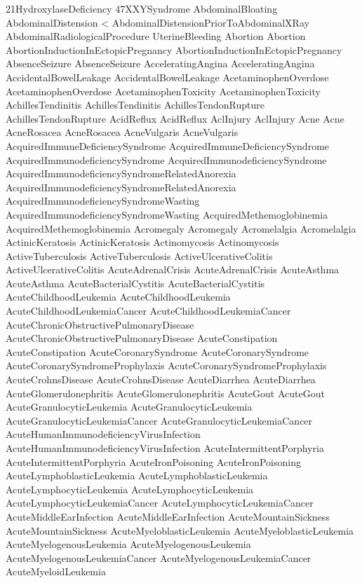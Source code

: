  21HydroxylaseDeficiency
 47XXYSyndrome
 AbdominalBloating
 AbdominalDistension < AbdominalDistensionPriorToAbdominalXRay
 AbdominalRadiologicalProcedure
 UterineBleeding
 Abortion
 Abortion
 AbortionInductionInEctopicPregnancy
 AbortionInductionInEctopicPregnancy
 AbsenceSeizure
 AbsenceSeizure
 AcceleratingAngina
 AcceleratingAngina
 AccidentalBowelLeakage
 AccidentalBowelLeakage
 AcetaminophenOverdose
 AcetaminophenOverdose
 AcetaminophenToxicity
 AcetaminophenToxicity
 AchillesTendinitis
 AchillesTendinitis
 AchillesTendonRupture
 AchillesTendonRupture
 AcidReflux
 AcidReflux
 AclInjury
 AclInjury
 Acne
 Acne
 AcneRosacea
 AcneRosacea
 AcneVulgaris
 AcneVulgaris
 AcquiredImmuneDeficiencySyndrome
 AcquiredImmuneDeficiencySyndrome
 AcquiredImmunodeficiencySyndrome
 AcquiredImmunodeficiencySyndrome
 AcquiredImmunodeficiencySyndromeRelatedAnorexia
 AcquiredImmunodeficiencySyndromeRelatedAnorexia
 AcquiredImmunodeficiencySyndromeWasting
 AcquiredImmunodeficiencySyndromeWasting
 AcquiredMethemoglobinemia
 AcquiredMethemoglobinemia
 Acromegaly
 Acromegaly
 Acromelalgia
 Acromelalgia
 ActinicKeratosis
 ActinicKeratosis
 Actinomycosis
 Actinomycosis
 ActiveTuberculosis
 ActiveTuberculosis
 ActiveUlcerativeColitis
 ActiveUlcerativeColitis
 AcuteAdrenalCrisis
 AcuteAdrenalCrisis
 AcuteAsthma
 AcuteAsthma
 AcuteBacterialCystitis
 AcuteBacterialCystitis
 AcuteChildhoodLeukemia
 AcuteChildhoodLeukemia
 AcuteChildhoodLeukemiaCancer
 AcuteChildhoodLeukemiaCancer
 AcuteChronicObstructivePulmonaryDisease
 AcuteChronicObstructivePulmonaryDisease
 AcuteConstipation
 AcuteConstipation
 AcuteCoronarySyndrome
 AcuteCoronarySyndrome
 AcuteCoronarySyndromeProphylaxis
 AcuteCoronarySyndromeProphylaxis
 AcuteCrohnsDisease
 AcuteCrohnsDisease
 AcuteDiarrhea
 AcuteDiarrhea
 AcuteGlomerulonephritis
 AcuteGlomerulonephritis
 AcuteGout
 AcuteGout
 AcuteGranulocyticLeukemia
 AcuteGranulocyticLeukemia
 AcuteGranulocyticLeukemiaCancer
 AcuteGranulocyticLeukemiaCancer
 AcuteHumanImmunodeficiencyVirusInfection
 AcuteHumanImmunodeficiencyVirusInfection
 AcuteIntermittentPorphyria
 AcuteIntermittentPorphyria
 AcuteIronPoisoning
 AcuteIronPoisoning
 AcuteLymphoblasticLeukemia
 AcuteLymphoblasticLeukemia
 AcuteLymphocyticLeukemia
 AcuteLymphocyticLeukemia
 AcuteLymphocyticLeukemiaCancer
 AcuteLymphocyticLeukemiaCancer
 AcuteMiddleEarInfection
 AcuteMiddleEarInfection
 AcuteMountainSickness
 AcuteMountainSickness
 AcuteMyeloblasticLeukemia
 AcuteMyeloblasticLeukemia
 AcuteMyelogenousLeukemia
 AcuteMyelogenousLeukemia
 AcuteMyelogenousLeukemiaCancer
 AcuteMyelogenousLeukemiaCancer
 AcuteMyeloidLeukemia
